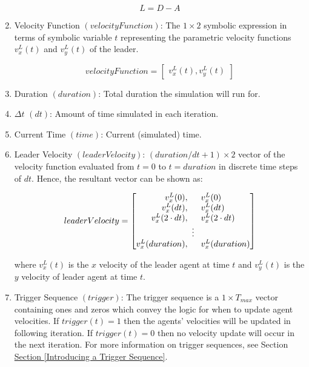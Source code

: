 \documentclass[../CourseManual.tex]{subfiles}
\begin{document}
\begin{enumerate}
    $$L = D - A$$
    
    \item Velocity Function $(velocityFunction)$: The $1 \times 2$ symbolic expression in terms of symbolic variable $t$ representing the parametric velocity functions $v^{L}_{x}(t)$ and $v^{L}_{y}(t)$ of the leader.
    
    $$velocityFunction = 
    \begin{bmatrix}
    v^{L}_{x}(t), v^{L}_{y}(t)
    \end{bmatrix}$$
    
    \item Duration $(duration)$: Total duration the simulation will run for.
    
    \item $\Delta t$ $(dt)$: Amount of time simulated in each iteration.
    
    \item Current Time $(time)$: Current (simulated) time.
    
    \item Leader Velocity $(leaderVelocity)$: $(duration/dt + 1) \times 2$ vector of the velocity function evaluated from $t=0$ to $t=duration$ in discrete time steps of $dt$. Hence, the resultant vector can be shown as:
    
    $$leaderVelocity = 
    \begin{bmatrix}
    v^{L}_{x}(0), \hspace{0.5cm} v^{L}_{x}(0) \\
    v^{L}_{x}(dt), \hspace{0.5cm} v^{L}_{x}(dt) \\
    v^{L}_{x}(2 \cdot dt), \hspace{0.5cm} v^{L}_{x}(2 \cdot dt) \\
    \vdots \\
    v^{L}_{x}(duration), \hspace{0.5cm} v^{L}_{x}(duration) \\
    \end{bmatrix}$$
    
    where $v^{L}_{x}(t)$ is the $x$ velocity of the leader agent at time $t$ and $v^{L}_{y}(t)$ is the $y$ velocity of leader agent at time $t$.
    
    \item Trigger Sequence $(trigger)$: The trigger sequence is a $1\times T_{max}$ vector containing ones and zeros which convey the logic for when to update agent velocities. If $trigger(t) = 1$ then the agents' velocities will be updated in following iteration. If $trigger(t) = 0$ then no velocity update will occur in the next iteration.  For more information on trigger sequences, see Section \hyperref[Introducing a Trigger Sequence]{Section \ref{Introducing a Trigger Sequence}}.
    

\end{enumerate}
\end{document}
